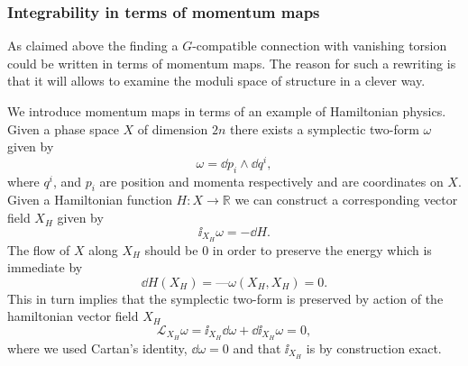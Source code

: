 \subsubsection{Integrability in terms of momentum maps}
As claimed above the finding a $G$-compatible connection with vanishing torsion could be written in terms of momentum maps. The reason for such a rewriting is that it will allows to examine the moduli space of structure in a clever way. 

We introduce momentum maps in terms of an example of Hamiltonian physics. Given a phase space $X$ of dimension $2n$ there exists a symplectic two-form $\omega$ given by
\begin{equation}
    \omega = \dd p_i\wedge\dd q^i,
\end{equation}
where $q^i$, and $p_i$ are position and momenta respectively and are coordinates on $X$. Given a Hamiltonian function $H: X\to\mathbb{R}$ we can construct a corresponding vector field $X_H$ given by 
\begin{equation}
    \ii _{X_H}\omega = -\dd H.
\end{equation}
The flow of $X$ along $X_H$ should be $0$ in order to preserve the energy which is immediate by 
\begin{equation}
    \dd H (X_H) = —\omega(X_H,X_H) = 0. 
\end{equation}
This in turn implies that the symplectic two-form is preserved by action of the hamiltonian vector field $X_H$ 
\begin{equation}
    \mathcal{L}_{X_H} \omega = \ii_{X_H}\dd \omega + \dd\ii_{X_H} \omega = 0,
\end{equation}
where we used Cartan's identity, $\dd\omega=0$ and that $\ii_{X_H}$ is by construction exact. 

